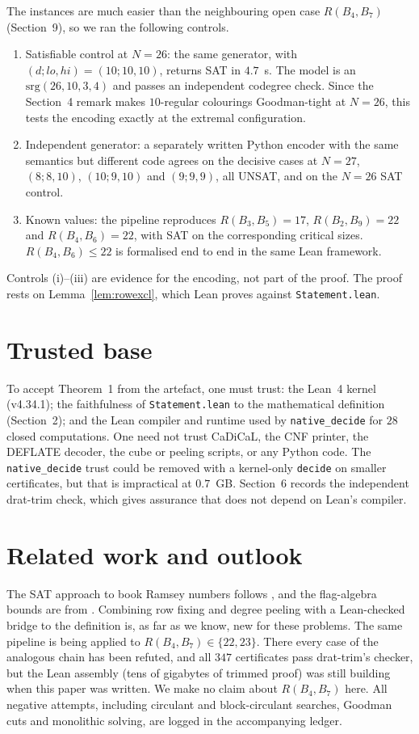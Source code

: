 \documentclass[11pt]{amsart}
\theoremstyle{definition}
\begin{document}
The instances are much easier than the neighbouring open case
$R(B_4,B_7)$ (Section~9), so we ran the following controls.
\begin{enumerate}[label=(\roman*)]
\item Satisfiable control at $N=26$: the same generator, with
$(d;lo,hi)=(10;10,10)$, returns SAT in $4.7$~s. The model is an
$\mathrm{srg}(26,10,3,4)$ and passes an independent codegree check.
Since the Section~4 remark makes $10$-regular colourings
Goodman-tight at $N=26$, this tests the encoding exactly at the
extremal configuration.
\item Independent generator: a separately written Python encoder with
the same semantics but different code agrees on the decisive cases at
$N=27$, $(8;8,10)$, $(10;9,10)$ and $(9;9,9)$, all UNSAT, and on the
$N=26$ SAT control.
\item Known values: the pipeline reproduces $R(B_3,B_5)=17$,
$R(B_2,B_9)=22$ and $R(B_4,B_6)=22$, with SAT on the corresponding
critical sizes. $R(B_4,B_6)\le 22$ is formalised end to end in the
same Lean framework.
\end{enumerate}
Controls (i)--(iii) are evidence for the encoding, not part of the
proof. The proof rests on Lemma~\ref{lem:rowexcl}, which Lean proves
against \texttt{Statement.lean}.

\section{Trusted base}

To accept Theorem~1 from the artefact, one must trust: the Lean~4
kernel (v4.34.1); the faithfulness of \texttt{Statement.lean} to the
mathematical definition (Section~2); and the Lean compiler and runtime
used by \texttt{native\_decide} for $28$ closed computations. One need
not trust CaDiCaL, the CNF printer, the DEFLATE decoder, the cube or
peeling scripts, or any Python code. The \texttt{native\_decide} trust
could be removed with a kernel-only \texttt{decide} on smaller
certificates, but that is impractical at $0.7$~GB. Section~6 records
the independent drat-trim check, which gives assurance that does not
depend on Lean's compiler.

\section{Related work and outlook}

The SAT approach to book Ramsey numbers follows \cite{Wes24}, and the
flag-algebra bounds are from \cite{LMPV24}. Combining row fixing and
degree peeling with a Lean-checked bridge to the definition is, as far
as we know, new for these problems. The same pipeline is being applied
to $R(B_4,B_7)\in\{22,23\}$. There every case of the analogous chain
has been refuted, and all $347$ certificates pass drat-trim's
checker, but the Lean assembly (tens of gigabytes of trimmed proof)
was still building when this paper was written. We make no claim about
$R(B_4,B_7)$ here. All negative attempts, including circulant and
block-circulant searches, Goodman cuts and monolithic solving, are
logged in the accompanying ledger.
\end{document}

